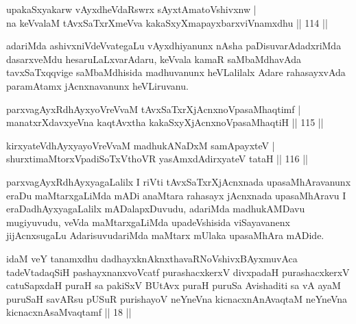 
\begin{shl}
upakaSxyakarw vAyxdheVdaRswrx sAyxtAmatoV\s shivxnw |\\
na keVvalaM tAvxSaTxrXmeVva kakaSxyXmapayxbarxviVnamxdhu \hfill || 114 ||
\end{shl}

\begin{artha}
adariMda ashivxniVdeVvategaLu vAyxdhiyanunx nAsha paDisuvarAdadxriMda dasarxveMdu hesaruLaLxvarAdaru, keVvala kamaR saMbaMdhavAda tavxSaTxqqvige saMbaMdhisida madhuvanunx heVLalilalx Adare rahasayxvAda paramAtamx jAcnxnavanunx heVLiruvanu.
\end{artha}


\begin{shl}
parxvagAyxRdhAyxyoVreVvaM tAvxSaTxrXjAcnxnoVpasaMhaqtimf |\\
manatxrXdavxyeVna kaqtAvx\s tha kakaSxyXjAcnxnoVpasaMhaqtiH \hfill || 115 ||
\end{shl}
\begin{shl}
kirxyateV\s dhAyxyayoVreVvaM madhukANaDxM samApayxteV |\\
shurxtimaMtorxVpadiSoTxV\s thoVR yasAmxdAdirxyateV tataH \hfill || 116 ||
\end{shl}

\begin{artha}
parxvagAyxRdhAyxyagaLalilx I riVti tAvxSaTxrXjAcnxnada upasaMhAravanunx eraDu maMtarxgaLiMda mADi anaMtara rahasayx jAcnxnada upasaMhAravu I eraDadhAyxyagaLalilx mADalapxDuvudu, adariMda madhukAMDavu mugiyuvudu, veVda maMtarxgaLiMda upadeVshisida viSayavanenx jijAcnxsugaLu AdarisuvudariMda maMtarx mUlaka upasaMhAra mADide.
\end{artha}


\begin{kandikeshl}
idaM veY tanamxdhu dadhayxknAknxthavaRNoV\s shivxBAyxmuvAca tadeVtadaqSiH pashayxnanxvoVcatf purashacxkerxV divxpadaH purashacxkerxV catuSapxdaH puraH sa pakiSxV BUtAvx puraH puruSa Avishaditi sa vA ayaM puruSaH savARsu pUSuR purishayoV neYneVna kicnacxnAnAvaqtaM neYneVna kicnacxnAsaMvaqtamf || 18 ||
\end{kandikeshl}


